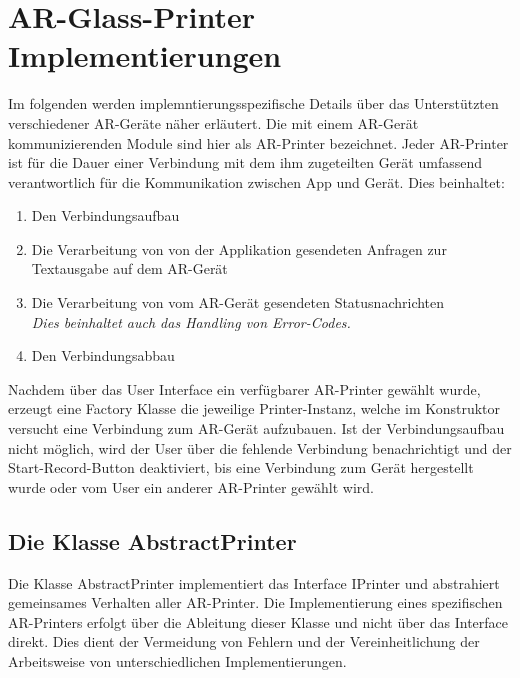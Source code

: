 \chapter{AR-Glass-Printer Implementierungen}
Im folgenden werden implemntierungsspezifische Details über das Unterstützten verschiedener AR-Geräte näher erläutert. Die mit einem AR-Gerät kommunizierenden Module sind hier als AR-Printer bezeichnet. 
Jeder AR-Printer ist für die Dauer einer Verbindung mit dem ihm zugeteilten Gerät umfassend verantwortlich für die Kommunikation zwischen App und Gerät.  Dies beinhaltet: 
\begin{enumerate}
	\item Den Verbindungsaufbau
	\item Die Verarbeitung von von der Applikation gesendeten Anfragen zur Textausgabe auf dem AR-Gerät
	\item Die Verarbeitung von vom AR-Gerät gesendeten Statusnachrichten\\
	\textit{Dies beinhaltet auch das Handling von Error-Codes.}
	\item Den Verbindungsabbau
\end{enumerate}
\par
Nachdem über das User Interface ein verfügbarer AR-Printer gewählt wurde, erzeugt eine Factory Klasse die jeweilige Printer-Instanz, welche im Konstruktor versucht eine Verbindung zum AR-Gerät aufzubauen. Ist der Verbindungsaufbau nicht möglich, wird der User über die fehlende Verbindung benachrichtigt und der Start-Record-Button deaktiviert, bis eine Verbindung zum Gerät hergestellt wurde oder vom User ein anderer AR-Printer gewählt wird.

\section{Die Klasse AbstractPrinter}\label{abstractprinter}
Die Klasse AbstractPrinter implementiert das Interface IPrinter und abstrahiert gemeinsames Verhalten aller AR-Printer. Die Implementierung eines spezifischen AR-Printers erfolgt über die Ableitung dieser Klasse und nicht über das Interface direkt. Dies dient der Vermeidung von Fehlern und der Vereinheitlichung der Arbeitsweise von unterschiedlichen Implementierungen.\\
